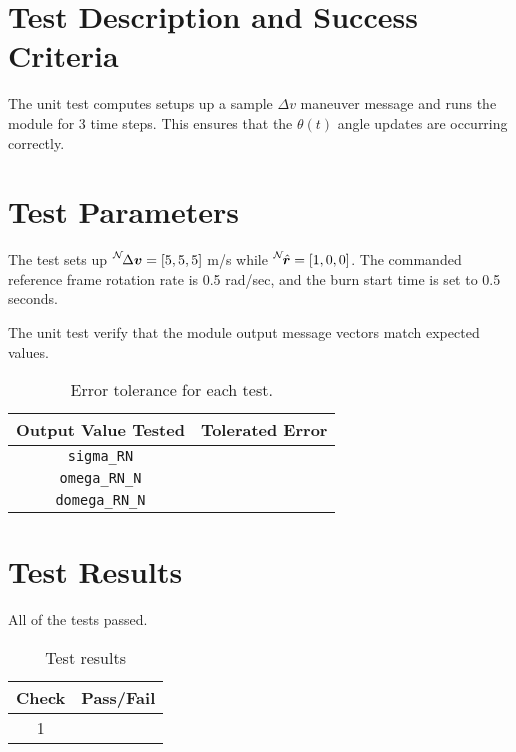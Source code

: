
\section{Test Description and Success Criteria}
The unit test computes setups up a sample $\Delta v$ maneuver message and runs the module for 3 time steps.  This ensures that the $\theta(t)$ angle updates  are occurring correctly.  





\section{Test Parameters}
The test sets up $\leftexp{N}{\Delta\bm v} = [5,5,5]$ m/s while $\leftexp{N}{\hat{\bm r}} = [1,0,0]$.  The commanded reference frame rotation rate is 0.5 rad/sec, and the burn start time is set to 0.5 seconds.  

The unit test verify that the module output message vectors match expected values.
\begin{table}[htbp]
	\caption{Error tolerance for each test.}
	\label{tab:errortol}
	\centering \fontsize{10}{10}\selectfont
	\begin{tabular}{ c | c } %
		\hline\hline
		\textbf{Output Value Tested}  & \textbf{Tolerated Error}  \\ 
		\hline
		{\tt sigma\_RN}        & 	   \\ 
		{\tt omega\_RN\_N}        & 	   \\ 
		{\tt domega\_RN\_N}        & 	   \\ 
		\hline\hline
	\end{tabular}
\end{table}




\section{Test Results}
All of the tests passed.
\begin{table}[H]
	\caption{Test results}
	\label{tab:results}
	\centering \fontsize{10}{10}\selectfont
	\begin{tabular}{c | c  } %
		\hline\hline
		\textbf{Check} &\textbf{Pass/Fail} \\ 
		\hline
	   1	   			&  \\ 
	   \hline\hline
	\end{tabular}
\end{table}
